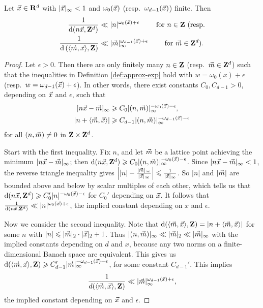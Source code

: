 \begin{lemma}\label{lem:bound-distance}
Let $\vec{x}\in \mathbf{R}^d$ with $|\vec{x}|_\infty< 1$ and $\omega_0(\vec{x})$ 
(resp.~$\omega_{d-1}(\vec{x})$) finite. Then 
\begin{align*}
	\frac{1}{\mathrm{d}(n \vec{x},\mathbf{Z}^d)} 
		&\ll |n|^{\omega_0(\vec{x})+\epsilon}\qquad \text{ for $n\in \mathbf{Z}$ (resp.} \\
	\frac{1}{\mathrm{d}\left(\langle \vec{m},\vec{x}\rangle, \mathbf{Z}\right)} 
		&\ll |\vec{m}|_\infty^{\omega_{d-1}(\vec{x})+\epsilon} \qquad\text{ for $\vec{m}\in \mathbf{Z}^d$).}
\end{align*}
\end{lemma}
\begin{proof}
Let $\epsilon>0$. Then there are only finitely many $n\in \mathbf{Z}$ 
(resp.~$\vec{m}\in \mathbf{Z}^d$) such that the inequalities in Definition 
\ref{def:approx-exp} hold with $w = \omega_0(x)+\epsilon$ 
(resp.~$w = \omega_{d-1}(\vec{x})+\epsilon$). In other words, there exist constants 
$C_0, C_{d-1}>0$, depending on $\vec{x}$ and $\epsilon$, such that 
\begin{align*}
	|n \vec{x} - \vec{m}|_\infty 
		&\geqslant C_0 |(n,\vec{m})|_\infty^{-\omega_0(\vec{x})-\epsilon} ,\\
	|n + \langle \vec{m},\vec{x}\rangle| 
		&\geqslant C_{d-1} |(n,\vec{m})|_\infty^{-\omega_{d-1}(\vec{x})-\epsilon} 
\end{align*}
for all $(n,\vec{m})\ne 0$ in $\mathbf{Z}\times\mathbf{Z}^d$. 

Start with the first inequality. Fix $n$, and let $\vec{m}$ be a lattice point 
achieving the minimum $|n \vec{x} - \vec{m}|_\infty$; then 
$\mathrm{d}(n \vec{x},\mathbf{Z}^d) \geqslant C_0 |(n,\vec{m})|_\infty^{-\omega_0(\vec{x})-\epsilon}$. 
Since $|n\vec{x} - \vec{m}|_\infty < 1$, the reverse triangle inequality gives 
$\left| |n| - \frac{|\vec{m}|_\infty}{|\vec{x}|_\infty}\right| \leqslant \frac{1}{|\vec{x}|_\infty}$. So $|n|$ and $|\vec{m}|$ are bounded above and below by scalar multiples 
of each other, which tells us that 
$\mathrm{d}(n \vec{x},\mathbf{Z}^d) \geqslant C_0' |n|^{-\omega_0(\vec{x})-\epsilon}$ for $C_0'$ 
depending on $\vec{x}$. It follows that 
$\frac{1}{\mathrm{d}(n \vec{x},\mathbf{Z}^d)} \ll |n|^{\omega_0(\vec{x})+\epsilon}$, the 
implied constant depending on $x$ and $\epsilon$.

Now we consider the second inequality. Note 
that $\mathrm{d}(\langle \vec{m},\vec{x}\rangle,\mathbf{Z}) = |n + \langle \vec{m},\vec{x}\rangle|$ for 
some $n$ with $|n| \leqslant |\vec{m}|_2\cdot |\vec{x}|_2 + 1$. Thus 
$|(n,\vec{m})|_\infty \ll |\vec{m}|_2 \ll |\vec{m}|_\infty$ with the implied constants 
depending on $d$ and $x$, because any two norms on a 
finite-dimensional Banach space are equivalent. This gives us 
$\mathrm{d}(\langle\vec{m},\vec{x}\rangle,\mathbf{Z}) \geqslant C_{d-1}' |\vec{m}|_\infty^{-\omega_{d-1}(\vec{x})-\epsilon}$, 
for some constant $C_{d-1}'$. This implies 
\[
	\frac{1}{d(\langle \vec{m},\vec{x}\rangle,\mathbf{Z})} \ll |\vec{m}|_\infty^{\omega_{d-1}(\vec{x})+\epsilon} ,
\]
the implied constant depending on $\vec{x}$ and $\epsilon$.
\end{proof}






